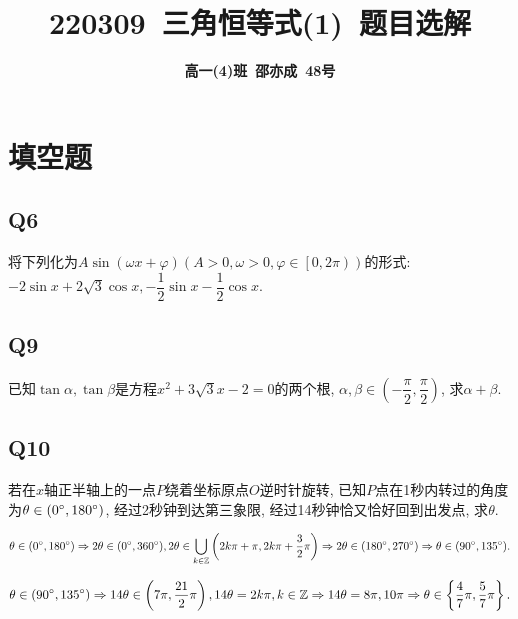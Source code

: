 \documentclass[8pt]{article}
\author{\normalfont\sffamily\large\bfseries{高一(4)班\ 邵亦成\ 48号}}
\title{\normalfont\sffamily\huge\bfseries{\textcolor{allanblue}{220309}\ \textcolor{allancyan}{三角恒等式(1)}\ 题目选解}}
\date{}
\begin{document}
	\maketitle

	\section{填空题}
		\subsection{Q6}
			 将下列化为$A\sin\left(\omega x + \varphi\right) \left(A>0, \omega>0, \varphi \in \left[0, 2\pi\right)\right)$的形式: $-2\sin x+2\sqrt{3}\cos x, -\dfrac{1}{2}\sin x-\dfrac{1}{2}\cos x.$

			\textit{}

		\subsection{Q9}
			 已知$\tan \alpha, \tan \beta$是方程$x^2+3\sqrt{3}x-2=0$的两个根, $\alpha, \beta \in \left(-\dfrac{\pi}{2}, \dfrac{\pi}{2}\right)$, 求$\alpha + \beta$.


		\subsection{Q10}
			 若在$x$轴正半轴上的一点$P$绕着坐标原点$O$逆时针旋转, 已知$P$点在1秒内转过的角度为$\theta \in (0^\circ, 180^\circ)$, 经过2秒钟到达第三象限, 经过14秒钟恰又恰好回到出发点, 求$\theta$.

			$$\theta \in (0^\circ, 180^\circ) \Rightarrow 2\theta \in (0^\circ, 360^\circ), 2\theta \in \bigcup_{k\in\mathbb{Z}} \left(2k\pi + \pi, 2k\pi + \frac{3}{2}\pi\right) \Rightarrow 2\theta \in (180^\circ, 270^\circ) \Rightarrow \theta \in (90^\circ, 135^\circ).$$

			$$\theta \in (90^\circ, 135^\circ) \Rightarrow 14\theta \in \left(7\pi, \dfrac{21}{2}\pi\right), 14\theta = 2k\pi, k\in \mathbb{Z} \Rightarrow 14\theta = 8\pi, 10\pi \Rightarrow \theta \in \left\{\dfrac{4}{7}\pi, \dfrac{5}{7}\pi\right\}.$$
\end{document}

